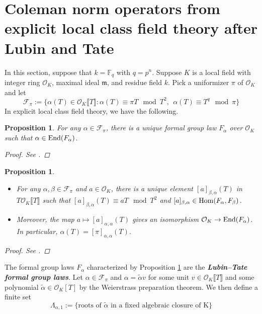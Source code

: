 \documentclass[12pt]{article}
\newtheorem{proposition}[theorem]{Proposition}
\theoremstyle{definition}
\def\F{\mathbb{F}}
\def\TF{\mathscr{F}}
\def\End{{\rm End}}
\def\Hom{{\rm Hom}}
\def\m{\mathfrak{m}}
\def\O{\mathcal{O}}
\begin{document}
    \section{Coleman norm operators from explicit local class field theory after Lubin and Tate} \label{Section 2}
    In this section, suppose that $k = \F_q$ with $q = p^n$. Suppose $K$ is a local field with integer ring $\O_K$, maximal ideal $\m$, and residue field $k$. Pick a uniformizer $\pi$ of $\O_K$ and let
    \begin{equation} \label{def of TF}
        \TF_\pi := \{\alpha(T) \in \O_K\llbracket T \rrbracket \colon \alpha(T) \equiv \pi T \mod{T^2},\ \ \alpha(T) \equiv T^q \mod{\pi}\}
    \end{equation}
    In explicit local class field theory, we have the following.  
    \begin{proposition}\label{LT FGL}
        For any $\alpha \in \TF_\pi$, there is a unique formal group law $F_\alpha$ over $\O_K$ such that $\alpha \in \End(F_\alpha)$. 
        \begin{proof}
            See \cite[I, 2.12]{Mil20}. 
        \end{proof}
    \end{proposition}
    \begin{proposition}\label{End LT FGL}
        \begin{itemize}
            \item [(a)] For any $\alpha,\beta \in \TF_\pi$ and $a \in \O_K$, there is a unique element $[a]_{\beta,\alpha}(T)$ in $T\O_K\llbracket T \rrbracket$ such that $[a]_{\beta,\alpha}(T) \equiv aT \mod{T^2}$ and $[a]_{\beta,\alpha} \in \Hom(F_\alpha,F_\beta)$. 
            \item [(b)] Moreover, the map $a \mapsto [a]_{\alpha,\alpha}(T)$ gives an isomorphism $\O_K \to \End(F_\alpha)$. In particular, $\alpha(T) = [\pi]_{\alpha,\alpha}(T)$. 
        \end{itemize}
        \begin{proof}
            See \cite[I, 2.14 and 2.17]{Mil20}. 
        \end{proof}
    \end{proposition}
    The formal group laws $F_\alpha$ characterized by Proposition \ref{LT FGL} are the \textbf{\em{Lubin--Tate formal group laws}}. Let $\alpha \in \TF_\pi$ and $\alpha = \tilde{\alpha}v$ for some unit $v \in \O_K\llbracket T \rrbracket$ and some polynomial $\tilde{\alpha} \in \O_K[T]$ by the Weierstrass preparation theorem. We then define a finite set 
    \begin{equation} \label{def of lambda_alpha,1}
        \Lambda_{\alpha,1} := \{\mbox{roots of }\tilde{\alpha}\mbox{ in a fixed algebraic closure of K}\}
    \end{equation}
\end{document}
